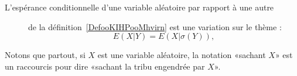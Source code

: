 \begin{description}
\item[L'espérance conditionnelle d'une variable aléatoire par rapport à une autre] de la définition~\ref{DefooKIHPooMhvirn} est une variation sur le thème :
\begin{equation}
    E(X|Y)=E(X|\sigma(Y)),
\end{equation}


\end{description}

Notons que partout, si \( X\) est une variable aléatoire, la notation «sachant \( X\)» est un raccourcis pour dire «sachant la tribu engendrée par \( X\)».

